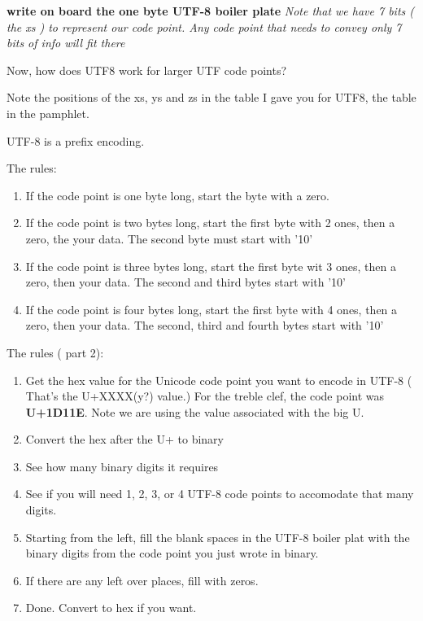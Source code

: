 \documentclass[12pt]{article}
\begin{document}
\begin{center}
\textbf{write on board the one byte UTF-8 boiler plate}
\textit{Note that we have 7 bits ( the xs ) to represent our code point. Any code point that needs to convey only 7 bits of info will fit there}
\end{center}

Now, how does UTF8 work for larger UTF code points?

Note the positions of the xs, ys and zs in the table I gave you for UTF8, the table in the pamphlet.

UTF-8 is a prefix encoding. 

The rules:
\begin{enumerate}
\item If the code point is one byte long, start the byte with a zero.
\item If the code point is two bytes long, start the first byte with 2 ones, then a zero, the your data. The second byte must start with '10'
\item If the code point is three bytes long, start the first byte wit 3 ones, then a zero, then your data. The second and third bytes start with '10'
\item If the code point is four bytes long, start the first byte with 4 ones, then a zero, then your data. The second, third and fourth bytes start with '10'
\end{enumerate}

The rules ( part 2):
\begin{enumerate}
\item Get the hex value for the Unicode code point you want to encode in UTF-8 ( That's the U+XXXX(y?) value.)
For the treble clef, the code point was \textbf{U+1D11E}. Note we are using the value associated with the big U.
\item Convert the hex after the U+ to binary
\item See how many binary digits it requires
\item See if you will need 1, 2, 3, or 4 UTF-8 code points to accomodate that many digits. 
\item Starting from the left, fill the blank spaces in the UTF-8 boiler plat with the binary digits from the code point you just wrote in binary.
\item If there are any left over places, fill with zeros.
\item Done. Convert to hex if you want.
\end{enumerate}
\end{document}
